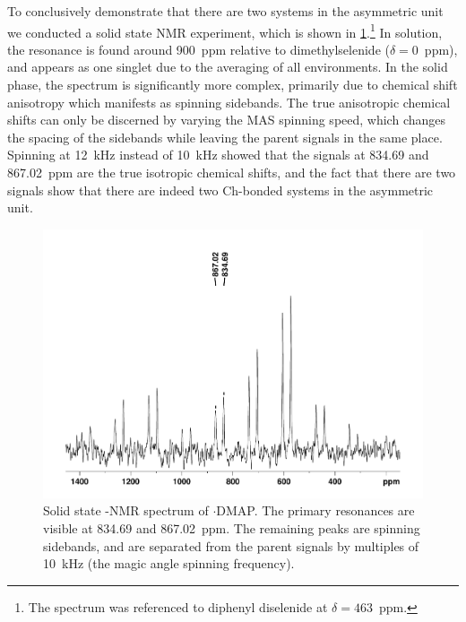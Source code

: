 \begin{refsection}
To conclusively demonstrate that there are two systems in the asymmetric unit we conducted a solid state  NMR experiment, which is shown in \cref{fig:cpmas-sol-77se}.\footnote{The  spectrum was referenced to diphenyl diselenide at $\delta=463$~ppm.}
In solution, the  resonance is found around 900~ppm relative to dimethylselenide ($\delta=0$~ppm), and appears as one singlet due to the averaging of all environments.
In the solid phase, the spectrum is significantly more complex, primarily due to chemical shift anisotropy which manifests as spinning sidebands.
The true anisotropic chemical shifts can only be discerned by varying the MAS spinning speed, which changes the spacing of the sidebands while leaving the parent signals in the same place.
Spinning at 12~kHz instead of 10~kHz showed that the signals at 834.69 and 867.02~ppm are the true isotropic chemical shifts, and the fact that there are two signals show that there are indeed two Ch-bonded systems in the asymmetric unit.

\begin{figure}
    \centering
    \includegraphics[width=0.7\linewidth]{Figures/ebs-4ome-dmap-cpmas-77se.pdf}
    \caption[Solid state -NMR spectrum of $\cdot$DMAP.]{Solid state -NMR spectrum of $\cdot$DMAP. The primary resonances are visible at 834.69 and 867.02~ppm. The remaining peaks are spinning sidebands, and are separated from the parent signals by multiples of 10~kHz (the magic angle spinning frequency).}
    \label{fig:cpmas-sol-77se}
\end{figure}


\end{refsection}

